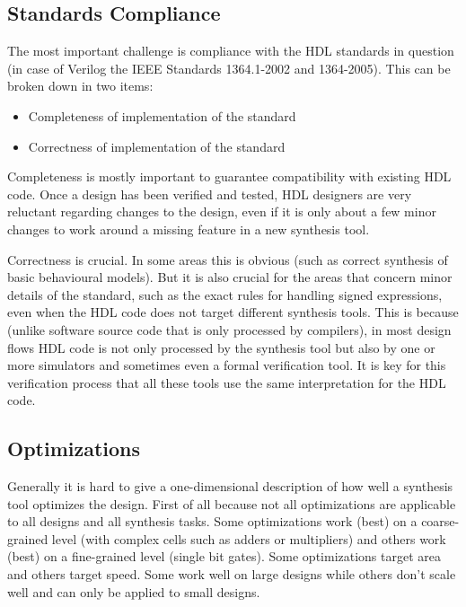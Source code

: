 \subsection{Standards Compliance}

The most important challenge is compliance with the HDL standards in question (in case
of Verilog the IEEE Standards 1364.1-2002 and 1364-2005). This can be broken down in two
items:

\begin{itemize}
\item Completeness of implementation of the standard
\item Correctness of implementation of the standard
\end{itemize}

Completeness is mostly important to guarantee compatibility
with existing HDL code. Once a design has been verified and tested, HDL designers
are very reluctant regarding changes to the design, even if it is only about
a few minor changes to work around a missing feature in a new synthesis tool.

Correctness is crucial. In some areas this is obvious (such as
correct synthesis of basic behavioural models). But it is also crucial for the
areas that concern minor details of the standard, such as the exact rules
for handling signed expressions, even when the HDL code does not target
different synthesis tools. This is because (unlike software source code that
is only processed by compilers), in most design flows HDL code is not only
processed by the synthesis tool but also by one or more simulators and sometimes
even a formal verification tool. It is key for this verification process
that all these tools use the same interpretation for the HDL code.

\subsection{Optimizations}

Generally it is hard to give a one-dimensional description of how well a synthesis tool
optimizes the design. First of all because not all optimizations are applicable to all
designs and all synthesis tasks. Some optimizations work (best) on a coarse-grained level
(with complex cells such as adders or multipliers) and others work (best) on a fine-grained
level (single bit gates). Some optimizations target area and others target speed.
Some work well on large designs while others don't scale well and can only be applied 
to small designs.

